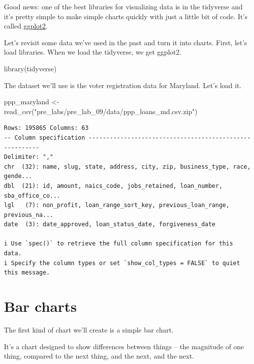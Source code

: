 \documentclass[
  letterpaper,
  DIV=11,
  numbers=noendperiod]{scrreprt}
\newenvironment{Shaded}{\begin{snugshade}}{\end{snugshade}}
\newcommand{\FunctionTok}[1]{\textcolor[rgb]{0.28,0.35,0.67}{#1}}
\newcommand{\NormalTok}[1]{\textcolor[rgb]{0.00,0.23,0.31}{#1}}
\newcommand{\OtherTok}[1]{\textcolor[rgb]{0.00,0.23,0.31}{#1}}
\newcommand{\StringTok}[1]{\textcolor[rgb]{0.13,0.47,0.30}{#1}}
\begin{document}
Good news: one of the best libraries for visualizing data is in the
tidyverse and it's pretty simple to make simple charts quickly with just
a little bit of code. It's called
\href{https://ggplot2.tidyverse.org/}{ggplot2}.

Let's revisit some data we've used in the past and turn it into charts.
First, let's load libraries. When we load the tidyverse, we get ggplot2.

\begin{Shaded}
\begin{Highlighting}[]
\FunctionTok{library}\NormalTok{(tidyverse)}
\end{Highlighting}
\end{Shaded}

The dataset we'll use is the voter registration data for Maryland. Let's
load it.

\begin{Shaded}
\begin{Highlighting}[]
\NormalTok{ppp\_maryland }\OtherTok{\textless{}{-}} \FunctionTok{read\_csv}\NormalTok{(}\StringTok{"pre\_labs/pre\_lab\_09/data/ppp\_loans\_md.csv.zip"}\NormalTok{)}
\end{Highlighting}
\end{Shaded}

\begin{verbatim}
Rows: 195865 Columns: 63
-- Column specification --------------------------------------------------------
Delimiter: ","
chr  (32): name, slug, state, address, city, zip, business_type, race, gende...
dbl  (21): id, amount, naics_code, jobs_retained, loan_number, sba_office_co...
lgl   (7): non_profit, loan_range_sort_key, previous_loan_range, previous_na...
date  (3): date_approved, loan_status_date, forgiveness_date

i Use `spec()` to retrieve the full column specification for this data.
i Specify the column types or set `show_col_types = FALSE` to quiet this message.
\end{verbatim}

\hypertarget{bar-charts}{%
\section{Bar charts}\label{bar-charts}}

The first kind of chart we'll create is a simple bar chart.

It's a chart designed to show differences between things -- the
magnitude of one thing, compared to the next thing, and the next, and
the next.
\end{document}
